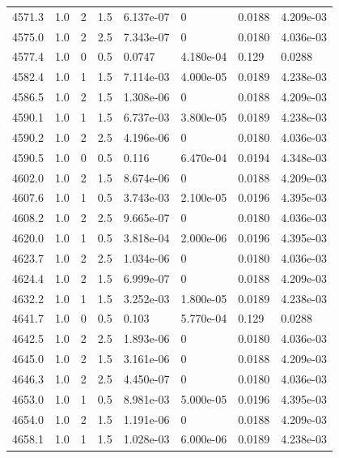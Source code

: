 \documentclass[preview]{standalone}
\begin{document}
{{{{{{{{{{{{{{{{{{\begin{tabular}{L{1.2cm}C{1.2cm} C{0.3cm}C{0.5cm} C{1.4cm}C{1.4cm} C{1.4cm}C{1.4cm}}
  4571.3  &   1.0  & 2     & 1.5 &  6.137e-07  & 0  & 0.0188 &  4.209e-03   \\ 
  4575.0  &   1.0  & 2     & 2.5 &  7.343e-07  & 0  & 0.0180 &  4.036e-03   \\ 
  4577.4  &   1.0  & 0     & 0.5 &  0.0747  & 4.180e-04  & 0.129 &  0.0288   \\ 
  4582.4  &   1.0  & 1     & 1.5 &  7.114e-03  & 4.000e-05  & 0.0189 &  4.238e-03   \\ 
  4586.5  &   1.0  & 2     & 1.5 &  1.308e-06  & 0  & 0.0188 &  4.209e-03   \\ 
  4590.1  &   1.0  & 1     & 1.5 &  6.737e-03  & 3.800e-05  & 0.0189 &  4.238e-03   \\ 
  4590.2  &   1.0  & 2     & 2.5 &  4.196e-06  & 0  & 0.0180 &  4.036e-03   \\ 
  4590.5  &   1.0  & 0     & 0.5 &  0.116  & 6.470e-04  & 0.0194 &  4.348e-03   \\ 
  4602.0  &   1.0  & 2     & 1.5 &  8.674e-06  & 0  & 0.0188 &  4.209e-03   \\ 
  4607.6  &   1.0  & 1     & 0.5 &  3.743e-03  & 2.100e-05  & 0.0196 &  4.395e-03   \\ 
  4608.2  &   1.0  & 2     & 2.5 &  9.665e-07  & 0  & 0.0180 &  4.036e-03   \\ 
  4620.0  &   1.0  & 1     & 0.5 &  3.818e-04  & 2.000e-06  & 0.0196 &  4.395e-03   \\ 
  4623.7  &   1.0  & 2     & 2.5 &  1.034e-06  & 0  & 0.0180 &  4.036e-03   \\ 
  4624.4  &   1.0  & 2     & 1.5 &  6.999e-07  & 0  & 0.0188 &  4.209e-03   \\ 
  4632.2  &   1.0  & 1     & 1.5 &  3.252e-03  & 1.800e-05  & 0.0189 &  4.238e-03   \\ 
  4641.7  &   1.0  & 0     & 0.5 &  0.103  & 5.770e-04  & 0.129 &  0.0288   \\ 
  4642.5  &   1.0  & 2     & 2.5 &  1.893e-06  & 0  & 0.0180 &  4.036e-03   \\ 
  4645.0  &   1.0  & 2     & 1.5 &  3.161e-06  & 0  & 0.0188 &  4.209e-03   \\ 
  4646.3  &   1.0  & 2     & 2.5 &  4.450e-07  & 0  & 0.0180 &  4.036e-03   \\ 
  4653.0  &   1.0  & 1     & 0.5 &  8.981e-03  & 5.000e-05  & 0.0196 &  4.395e-03   \\ 
  4654.0  &   1.0  & 2     & 1.5 &  1.191e-06  & 0  & 0.0188 &  4.209e-03   \\ 
  4658.1  &   1.0  & 1     & 1.5 &  1.028e-03  & 6.000e-06  & 0.0189 &  4.238e-03   \\ 

\end{tabular}}}}}}}}}}}}}}}}}}}
\end{document}
